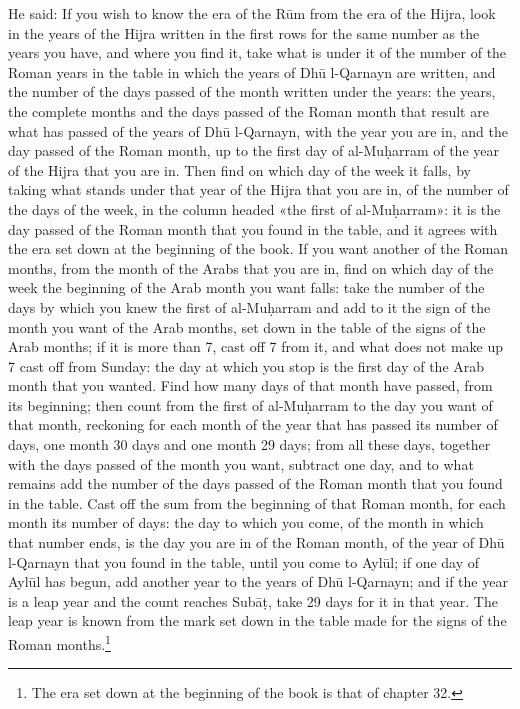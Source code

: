 \documentclass[11pt]{article}
\newcommand{\ArPage}[1]{\marginpar{\footnotesize\color{gray}Ar.\,p.\,#1}}
\begin{document}
\par \ArPage{221}He said: If you wish to know the era of the Rūm from the era of the Hijra, look in the years of the Hijra written in the first rows for the same number as the years you have, and where you find it, take what is under it of the number of the Roman years in the table in which the years of Dhū l-Qarnayn are written, and the number of the days passed of the month written under the years: the years, the complete months and the days passed of the Roman month that result are what has passed of the years of Dhū l-Qarnayn, with the year you are in, and the day passed of the Roman month, up to the first day of al-Muḥarram of the year of the Hijra that you are in. Then find on which day of the week it falls, by taking what stands under that year of the Hijra that you are in, of the number of the days of the week, in the column headed «the first of al-Muḥarram»: it is the day passed of the Roman month that you found in the table, and it agrees with the era set down at the beginning of the book. If you want another of the Roman months, from the month of the Arabs that you are in, find on which day of the week the beginning of the Arab month you want falls: take the number of the days by which you knew the first of al-Muḥarram and add to it the sign of the month you want of the Arab months, set down in the table of the signs of the Arab months; if it is more than 7, cast off 7 from it, and what does not make up 7 cast off from Sunday: the day at which you stop is the first day of the Arab month that you wanted. Find how many days of that month have passed, from its beginning; then count from the first of al-Muḥarram to the day you want of that month, reckoning for each month of the year that has passed its number of days, one month 30 days and one month 29 days; from all these days, together with the days passed of the month you want, subtract one day, and to what remains add the number of the days passed of the Roman month that you found in the table. Cast off the sum from the beginning of that Roman month, for each month its number of days: the day to which you come, of the month in which that number ends, is the day you are in of the Roman month, of the year of Dhū l-Qarnayn that you found in the table, until you come to Aylūl; if one day of Aylūl has begun, add another year to the years of Dhū l-Qarnayn; and if the year is a leap year and the count reaches Subāṭ, take 29 days for it in that year. The leap year is known from the mark set down in the table made for the signs of the Roman months.\footnote{The era set down at the beginning of the book is that of chapter 32.}\par
\end{document}
